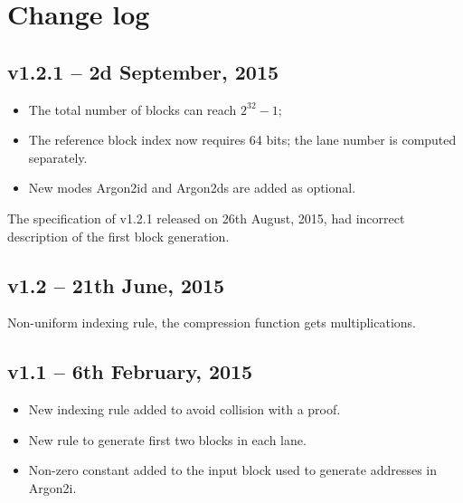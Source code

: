 \documentclass[a4paper]{article}
\begin{document}
\section{Change log}

\subsection{v1.2.1 -- 2d September, 2015}
\begin{itemize}
\item The total number of blocks can reach $2^{32}-1$;
\item The reference block index now requires 64 bits; the lane number is computed separately.
\item New modes \textsf{Argon2id} and \textsf{Argon2ds} are added as optional.
\end{itemize}
The specification of v1.2.1 released on 26th August, 2015, had incorrect description of the first block generation.

\subsection{v1.2  -- 21th June, 2015}

Non-uniform  indexing rule, the compression function gets multiplications.

\subsection{v1.1  -- 6th February, 2015}
\begin{itemize}
\item New indexing rule added to avoid collision with a proof. 
\item New rule to generate first two blocks in each lane.
\item Non-zero constant added to the input block used to generate addresses in \textsf{Argon2i}.
\end{itemize}
\end{document}
